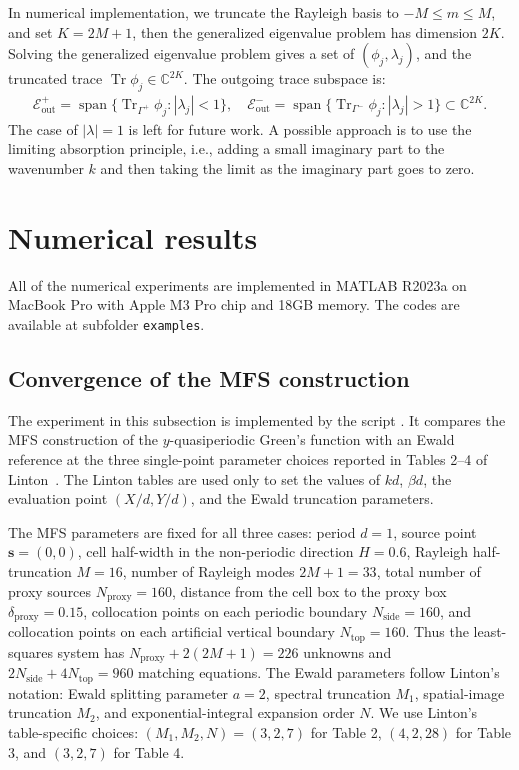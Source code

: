 \documentclass[11pt,fleqn]{article}
\theoremstyle{definition}
\theoremstyle{remark}
\begin{document}
In numerical implementation, we truncate the Rayleigh basis to \(-M\leq m\leq M\), and set \(K=2M+1\), then the generalized eigenvalue problem has dimension $2K$. Solving the generalized eigenvalue problem gives a set of $(\phi_j, \lambda_j)$, and the truncated
trace $\operatorname{Tr} \phi_j \in \mathbb{C}^{2K}$. The outgoing trace subspace is: 
\begin{align}
  \mathcal{E}^+_\mathrm{out} = \operatorname{span}\{\operatorname{Tr}_{\Gamma^+} \phi_j: |\lambda_j| < 1\},\quad \mathcal{E}^-_\mathrm{out} = \operatorname{span}\{\operatorname{Tr}_{\Gamma^-} \phi_j: |\lambda_j| > 1\} \subset \mathbb{C}^{2K}.
\end{align}
The case of $|\lambda| = 1$ is left for future work. A possible approach is to use the limiting absorption principle, i.e., adding a small imaginary part to the wavenumber $k$ and then taking the limit as the imaginary part goes to zero.

\section{Numerical results}
All of the numerical experiments are implemented in MATLAB R2023a on MacBook Pro with Apple M3 Pro chip and 18GB memory. The codes are available at subfolder \texttt{examples}.

\subsection{Convergence of the MFS construction}
The experiment in this subsection is implemented by the script
. It compares the MFS construction
of the \(y\)-quasiperiodic Green's function with an Ewald reference at the
three single-point parameter choices reported in Tables 2--4 of
Linton~\cite{Linton1998}. The Linton tables are used only to set the values of
\(kd\), \(\beta d\), the evaluation point \((X/d,Y/d)\), and the Ewald
truncation parameters.

The MFS parameters are fixed for all three cases: period \(d=1\), source point
\(\mathbf{s}=(0,0)\), cell half-width in the non-periodic direction \(H=0.6\),
Rayleigh half-truncation \(M=16\), number of Rayleigh modes \(2M+1=33\), total
number of proxy sources \(N_{\mathrm{proxy}}=160\), distance from the cell box
to the proxy box \(\delta_{\mathrm{proxy}}=0.15\), collocation points on each
periodic boundary \(N_{\mathrm{side}}=160\), and collocation points on each
artificial vertical boundary \(N_{\mathrm{top}}=160\). Thus the least-squares system has
\(N_{\mathrm{proxy}}+2(2M+1)=226\) unknowns and
\(2N_{\mathrm{side}}+4N_{\mathrm{top}}=960\) matching equations. The Ewald
parameters follow Linton's notation: Ewald splitting parameter \(a=2\),
spectral truncation \(M_1\), spatial-image truncation \(M_2\), and
exponential-integral expansion order \(N\). We use Linton's table-specific
choices: \((M_1,M_2,N)=(3,2,7)\) for Table 2, \((4,2,28)\) for Table 3, and
\((3,2,7)\) for Table 4.
\end{document}
